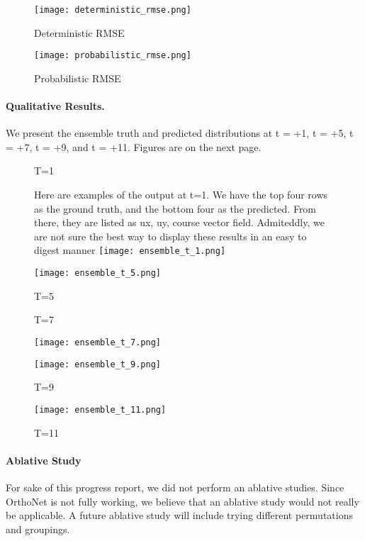\documentclass{article}
\begin{document}
    \begin{figure}
        \centering
        \caption{Deterministic RMSE}
        \texttt{[image: deterministic\_rmse.png]}
    \end{figure}

    \begin{figure}
        \centering
        \caption{Probabilistic RMSE}
        \texttt{[image: probabilistic\_rmse.png]}
    \end{figure}

    \paragraph{Qualitative Results.} We present the ensemble truth and predicted distributions at t = +1, t = +5, t = +7, t = +9, and t = +11. Figures are on the next page.

    \newpage

    \begin{figure}[H]
        \centering
        \caption{T=1}
        \medskip
        \small
        Here are examples of the output at t=1. We have the top four rows as the ground truth, and the bottom four as the predicted. From there, they are listed as ux, uy, course vector field. Admiteddly, we are not sure the best way to display these results in an easy to digest manner
        \texttt{[image: ensemble\_t\_1.png]}

        \centering
        \caption{T=5}
        \texttt{[image: ensemble\_t\_5.png]}

    \end{figure}

    \newpage

    \begin{figure}[H]
        \centering
        \caption{T=7}
        \texttt{[image: ensemble\_t\_7.png]}

        \centering
        \caption{T=9}
        \texttt{[image: ensemble\_t\_9.png]}
    \end{figure}

    \newpage
    \begin{figure}[H]
        \centering
        \caption{T=11}
        \texttt{[image: ensemble\_t\_11.png]}
    \end{figure}
    \newpage

    \paragraph{Ablative Study} For sake of this progress report, we did not perform an ablative studies. Since OrthoNet is not fully working, we believe that an ablative study would not really be applicable. A future ablative study will include trying different permutations and groupings.
\end{document}
